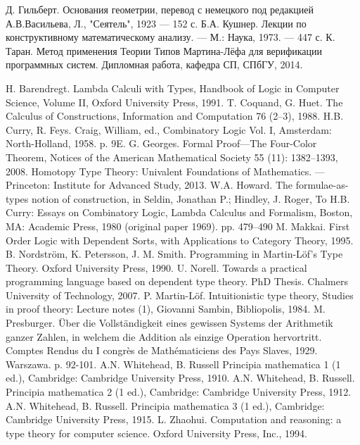 \documentclass[14pt]{matmex-diploma-custom}
\begin{document}
\newpage
\begin{thebibliography}{9}
    Д. Гильберт. Основания геометрии, перевод с немецкого под редакцией А.В.Васильева,
    Л., "Сеятель", 1923 — 152 с.
    Б.А. Кушнер. Лекции по конструктивному математическому анализу. — М.: Наука, 1973. — 447 с.
    К. Таран. Метод применения Теории Типов Мартина-Лёфа для верификации программных систем.
    Дипломная работа, кафедра СП, СПбГУ, 2014.
  
    H. Barendregt. Lambda Calculi with Types, Handbook of Logic in Computer Science, Volume II, Oxford University Press, 1991.
    T. Coquand, G. Huet. The Calculus of Constructions, Information and Computation 76 (2–3), 1988.
    H.B. Curry, R. Feys. Craig, William, ed., Combinatory Logic Vol. I, Amsterdam: North-Holland, 1958. p. 9E.
    G. Georges. Formal Proof—The Four-Color Theorem, Notices of the American Mathematical Society 55 (11): 1382–1393, 2008.
    Homotopy Type Theory: Univalent Foundations of Mathematics. — Princeton: Institute for Advanced Study, 2013.
    W.A. Howard. The formulae-as-types notion of construction, in Seldin, Jonathan P.; Hindley, J. Roger, To H.B. Curry: Essays on Combinatory Logic, Lambda Calculus and Formalism, Boston, MA: Academic Press, 1980 (original paper 1969). pp. 479–490
 M. Makkai. First Order Logic with Dependent Sorts, with Applications to Category Theory, 1995.
    B. Nordström, K. Petersson, J. M. Smith. Programming in Martin-Löf's Type Theory. Oxford University Press, 1990.
    U. Norell. Towards a practical programming language based on dependent type theory. PhD Thesis. Chalmers University of Technology, 2007.
   P. Martin-Löf. Intuitionistic type theory,
    Studies in proof theory: Lecture notes (1), Giovanni Sambin, Bibliopolis, 1984.
    M. Presburger. Über die Vollständigkeit eines gewissen Systems der Arithmetik ganzer Zahlen, in welchem die Addition als einzige Operation hervortritt. Comptes Rendus du I congrès de Mathématiciens des Pays Slaves, 1929.  Warszawa. p. 92-101.
    A.N. Whitehead, B. Russell Principia mathematica 1 (1 ed.), Cambridge: Cambridge University Press, 1910.
    A.N. Whitehead, B. Russell. Principia mathematica 2 (1 ed.), Cambridge: Cambridge University Press, 1912.
    A.N. Whitehead, B. Russell. Principia mathematica 3 (1 ed.), Cambridge: Cambridge University Press, 1915.
     L. Zhaohui. Computation and reasoning: a type theory for computer science. Oxford University Press, Inc., 1994.
\end{thebibliography}
\end{document}

